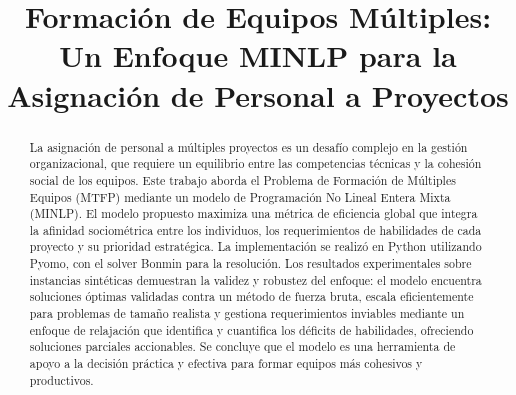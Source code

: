 \documentclass[conference]{IEEEtran}
\begin{document}
\title{Formación de Equipos Múltiples: Un Enfoque MINLP para la Asignación de Personal a Proyectos}

\author{
}

\maketitle

\begin{abstract}
    La asignación de personal a múltiples proyectos es un desafío complejo en la gestión organizacional, que requiere un equilibrio entre las competencias técnicas y la cohesión social de los equipos. Este trabajo aborda el Problema de Formación de Múltiples Equipos (MTFP) mediante un modelo de Programación No Lineal Entera Mixta (MINLP). El modelo propuesto maximiza una métrica de eficiencia global que integra la afinidad sociométrica entre los individuos, los requerimientos de habilidades de cada proyecto y su prioridad estratégica. La implementación se realizó en Python utilizando Pyomo, con el solver Bonmin para la resolución. Los resultados experimentales sobre instancias sintéticas demuestran la validez y robustez del enfoque: el modelo encuentra soluciones óptimas validadas contra un método de fuerza bruta, escala eficientemente para problemas de tamaño realista y gestiona requerimientos inviables mediante un enfoque de relajación que identifica y cuantifica los déficits de habilidades, ofreciendo soluciones parciales accionables. Se concluye que el modelo es una herramienta de apoyo a la decisión práctica y efectiva para formar equipos más cohesivos y productivos.

\end{abstract}
\end{document}
